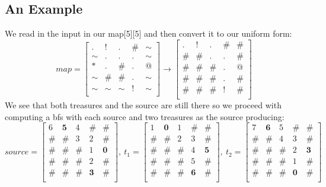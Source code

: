 \documentclass[12pt]{article}
\begin{document}
\subsection{An Example}
We read in the input in our map[5][5] and then convert it to our uniform form:
\[
map =
\begin{bmatrix}
 .& !& .& \#& \sim         \\
 \sim& .& .& .& \sim       \\
 \ast& .& \#& .& @         \\
 \sim& \#& \#& .& \sim     \\
 \sim& \sim& \sim& !& \sim \\
\end{bmatrix}
\rightarrow
\begin{bmatrix}
.&   !&  .& \#& \# \\
\#& \#&  .&  .& \# \\
\#& \#& \#&  .&  @ \\
\#& \#& \#&  .& \# \\
\#& \#& \#&  !& \# \\
\end{bmatrix}
\]
We see that both treasures and the source are still there so we proceed with
computing a bfs with each source and two treasures as the source producing:
\[
source =
\begin{bmatrix}
6&   \textbf{5}&  4& \#& \# \\
\#& \#&  3&  2& \# \\
\#& \#& \#&  1&  \textbf{0} \\
\#& \#& \#&  2& \# \\
\#& \#& \#&  \textbf{3}& \# \\
\end{bmatrix}
,\ t_1 =
\begin{bmatrix}
1&   \textbf{0}&  1& \#& \# \\
\#& \#&  2&  3& \# \\
\#& \#& \#&  4&  \textbf{5} \\
\#& \#& \#&  5& \# \\
\#& \#& \#&  \textbf{6}& \# \\
\end{bmatrix}
,\ t_2 =
\begin{bmatrix}
7&   \textbf{6}&  5& \#& \# \\
\#& \#&  4&  3& \# \\
\#& \#& \#&  2&  \textbf{3} \\
\#& \#& \#&  1& \# \\
\#& \#& \#&  \textbf{0}& \# \\
\end{bmatrix}
\]
\end{document}
